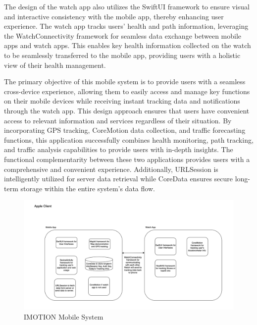 \documentclass[12pt,two side]{report}
\begin{document}
The design of the watch app also utilizes the SwiftUI framework to ensure visual and interactive consistency with the mobile app, thereby enhancing user experience. The watch app tracks users' health and path information, leveraging the WatchConnectivity framework for seamless data exchange between mobile apps and watch apps. This enables key health information collected on the watch to be seamlessly transferred to the mobile app, providing users with a holistic view of their health management.\newline

The primary objective of this mobile system is to provide users with a seamless cross-device experience, allowing them to easily access and manage key functions on their mobile devices while receiving instant tracking data and notifications through the watch app. This design approach ensures that users have convenient access to relevant information and services regardless of their situation. By incorporating GPS tracking, CoreMotion data collection, and traffic forecasting functions, this application successfully combines health monitoring, path tracking, and traffic analysis capabilities to provide users with in-depth insights. The functional complementarity between these two applications provides users with a comprehensive and convenient experience. Additionally, URLSession is intelligently utilized for server data retrieval while CoreData ensures secure long-term storage within the entire system's data flow.

\begin{figure}
\centering
\includegraphics[width=16cm]{background_report/figures/mobile-system.png}
\caption{IMOTION Mobile System}
\label{figure:3}
\end{figure}
\end{document}
